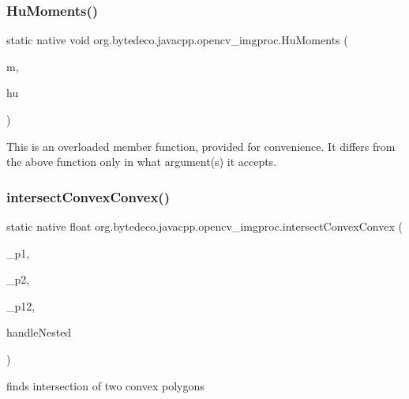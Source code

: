 \subsubsection{\texorpdfstring{Hu\+Moments()}{HuMoments()}\hspace{0.1cm}{\footnotesize\ttfamily [2/2]}}
{\footnotesize\ttfamily static native void org.\+bytedeco.\+javacpp.\+opencv\+\_\+imgproc.\+Hu\+Moments (\begin{DoxyParamCaption}\item[{@Const @By\+Ref Moments}]{m,  }\item[{@By\+Val Mat}]{hu }\end{DoxyParamCaption})\hspace{0.3cm}{\ttfamily [static]}}

This is an overloaded member function, provided for convenience. It differs from the above function only in what argument(s) it accepts. \mbox{\label{group__imgproc__shape_ga1664076df6a9c8e2780c3650b12551a1}} 
\subsubsection{\texorpdfstring{intersect\+Convex\+Convex()}{intersectConvexConvex()}}
{\footnotesize\ttfamily static native float org.\+bytedeco.\+javacpp.\+opencv\+\_\+imgproc.\+intersect\+Convex\+Convex (\begin{DoxyParamCaption}\item[{@By\+Val Mat}]{\+\_\+p1,  }\item[{@By\+Val Mat}]{\+\_\+p2,  }\item[{@By\+Val Mat}]{\+\_\+p12,  }\item[{@Cast(\char`\"{}bool\char`\"{}) boolean}]{handle\+Nested }\end{DoxyParamCaption})\hspace{0.3cm}{\ttfamily [static]}}

finds intersection of two convex polygons \mbox{\label{group__imgproc__shape_gad00ac2d87b83a753b5edcdbb2daf526f}} 
